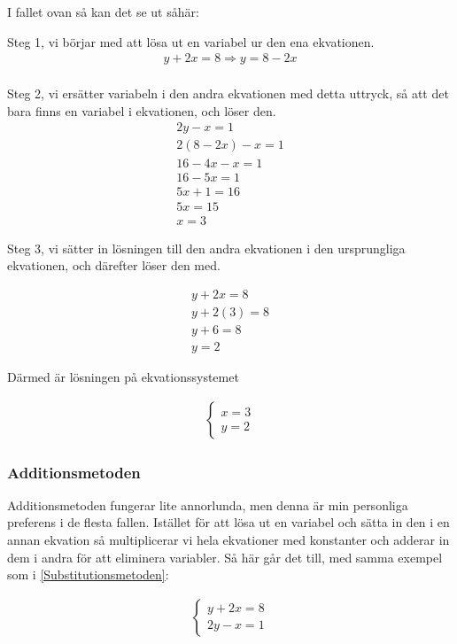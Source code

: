 I fallet ovan så kan det se ut såhär:

Steg 1, vi börjar med att lösa ut en variabel ur den ena ekvationen.
\begin{align}
	y+2x = 8 \Rightarrow y = 8-2x \\
\end{align}

Steg 2, vi ersätter variabeln i den andra ekvationen med detta uttryck, så att det bara finns en variabel i ekvationen, och löser den.
\begin{align}
	2y-x = 1 \\
	2(8-2x)-x = 1 \\
	16-4x-x = 1 \\
	16-5x = 1 \\
	5x + 1 = 16 \\
	5x = 15 \\
	x = 3
\end{align}

Steg 3, vi sätter in lösningen till den andra ekvationen i den ursprungliga ekvationen, och därefter löser den med.

\begin{align}
	y+2x = 8 \\
	y+2(3) = 8 \\
	y+6 = 8 \\
	y = 2
\end{align}

Därmed är lösningen på ekvationssystemet

\begin{align*}
	\begin{cases}
		x = 3 \\
		y = 2
	\end{cases}
\end{align*}

\newpage
\subsubsection{Additionsmetoden}
\label{Additionsmetoden}

Additionsmetoden fungerar lite annorlunda, men denna är min personliga preferens i de flesta fallen. Istället för att lösa ut en variabel och sätta in den i en annan ekvation så multiplicerar vi hela ekvationer med konstanter och adderar in dem i andra för att eliminera variabler. Så här går det till, med samma exempel som i \ref{Substitutionsmetoden}:

\begin{align}
	\begin{cases}
		y+2x=8 \\
		2y-x = 1
	\end{cases}
\end{align}

